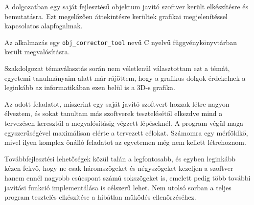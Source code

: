 A dolgozatban egy saját fejlesztésű objektum javító szoftver került elkészítésre és bemutatásra. Ezt megelőzően áttekintésre kerültek grafikai megjelenítéssel kapcsolatos alapfogalmak.

Az alkalmazás egy \texttt{obj\_corrector\_tool} nevű C nyelvű függvénykönyvtárban került megvalósításra.

Szakdolgozat témaválasztás során nem véletlenül választottam ezt a témát, egyetemi tanulmányaim alatt már rájöttem, hogy a grafikus dolgok érdekelnek a leginkább az informatikában ezen belül is a 3D-s grafika.

Az adott feladatot, miszerint egy saját javító szoftvert hozzak létre nagyon élveztem, és sokat tanultam más szoftverek tesztelésétől elkezdve mind a tervezésen keresztül a megvalósításig végzett lépéseknél.
A program végül maga egyszerűségével maximálisan elérte a tervezett célokat. Számomra egy mérföldkő, mivel ilyen komplex önálló feladatot az egyetemen még nem kellett létrehoznom.

Továbbfejlesztési lehetőségek közül talán a legfontosabb, és egyben leginkább kézen fekvő, hogy ne csak háromszögeket és négyszögeket kezeljen a szoftver hanem ennél nagyobb csúcspont számú sokszögeket is, emelett pedig több további javítási funkció implementálása is célszerű lehet. Nem utolsó sorban a teljes program tesztelés elkészítése a hibátlan működés ellenőrzéséhez.
